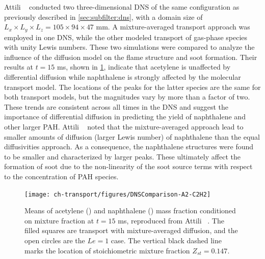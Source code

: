 
Attili \etal~\cite{attili2016} conducted two three-dimensional DNS of the same configuration as previously described in \cref{sec:subfilter:dns}, with a domain size of $L_x \times L_y \times L_z = 105 \times 94 \times 47$ mm. A mixture-averaged transport approach was employed in one DNS, while the other modeled transport of gas-phase species with unity Lewis numbers. These two simulations were compared to analyze the influence of the diffusion model on the flame structure and soot formation. Their results at $t = 15$ ms, shown in \cref{fig:transport:overview:lei:a2vsz}, indicate that acetylene is unaffected by differential diffusion while naphthalene is strongly affected by the molecular transport model. The locations of the peaks for the latter species are the same for both transport models, but the magnitudes vary by more than a factor of two. These trends are consistent across all times in the DNS and suggest the importance of differential diffusion in predicting the yield of naphthalene and other larger PAH. Attili \etal~\cite{attili2016} noted that the mixture-averaged approach lead to smaller amounts of diffusion (larger Lewis number) of naphthalene than the equal diffusivities approach. As a consequence, the naphthalene structures were found to be smaller and characterized by larger peaks. These ultimately affect the formation of soot due to the non-linearity of the soot source terms with respect to the concentration of PAH species.

\begin{figure}[htb]
  \centering
  \texttt{[image: ch-transport/figures/DNSComparison-A2-C2H2]}
  \caption[DNS Results with $Le = 1$ and $Le \neq 1$, $\langle Y_{\ce{C2H2}}|Z \rangle$ \& $\langle Y_{\text{A2}}|Z \rangle$ vs. $Z$]{Means of acetylene () and naphthalene () mass fraction conditioned on mixture fraction at $t = 15$ ms, reproduced from Attili \etal~\cite{attili2016}. The filled squares are transport with mixture-averaged diffusion, and the open circles are the $Le = 1$ case. The vertical black dashed line marks the location of stoichiometric mixture fraction $Z_{st} = 0.147$.}
  \label{fig:transport:overview:lei:a2vsz}
\end{figure}

